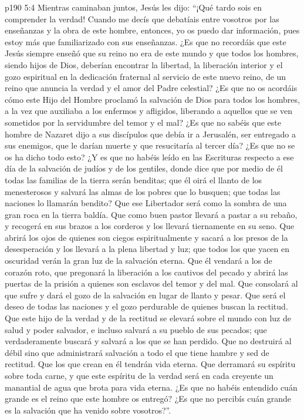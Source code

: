 \vs p190 5:4 Mientras caminaban juntos, Jesús les dijo: “¡Qué tardo sois en comprender la verdad! Cuando me decís que debatíais entre vosotros por las enseñanzas y la obra de este hombre, entonces, yo os puedo dar información, pues estoy más que familiarizado con sus enseñanzas. ¿Es que no recordáis que este Jesús siempre enseñó que su reino no era de este mundo y que todos los hombres, siendo hijos de Dios, deberían encontrar la libertad, la liberación interior y el gozo espiritual en la dedicación fraternal al servicio de este nuevo reino, de un reino que anuncia la verdad y el amor del Padre celestial? ¿Es que no os acordáis cómo este Hijo del Hombre proclamó la salvación de Dios para todos los hombres, a la vez que auxiliaba a los enfermos y afligidos, liberando a aquellos que se ven sometidos por la servidumbre del temor y el mal? ¿Es que no sabéis que este hombre de Nazaret dijo a sus discípulos que debía ir a Jerusalén, ser entregado a sus enemigos, que le darían muerte y que resucitaría al tercer día? ¿Es que no se os ha dicho todo esto? ¿Y es que no habéis leído en las Escrituras respecto a ese día de la salvación de judíos y de los gentiles, donde dice que por medio de él todas las familias de la tierra serán benditas; que él oirá el llanto de los menesterosos y salvará las almas de los pobres que lo busquen; que todas las naciones lo llamarán bendito? Que ese Libertador será como la sombra de una gran roca en la tierra baldía. Que como buen pastor llevará a pastar a su rebaño, y recogerá en sus brazos a los corderos y los llevará tiernamente en su seno. Que abrirá los ojos de quienes son ciegos espiritualmente y sacará a los presos de la desesperación y los llevará a la plena libertad y luz; que todos los que yacen en oscuridad verán la gran luz de la salvación eterna. Que él vendará a los de corazón roto, que pregonará la liberación a los cautivos del pecado y abrirá las puertas de la prisión a quienes son esclavos del temor y del mal. Que consolará al que sufre y dará el gozo de la salvación en lugar de llanto y pesar. Que será el deseo de todas las naciones y el gozo perdurable de quienes buscan la rectitud. Que este hijo de la verdad y de la rectitud se elevará sobre el mundo con luz de salud y poder salvador, e incluso salvará a su pueblo de sus pecados; que verdaderamente buscará y salvará a los que se han perdido. Que no destruirá al débil sino que administrará salvación a todo el que tiene hambre y sed de rectitud. Que los que crean en él tendrán vida eterna. Que derramará su espíritu sobre toda carne, y que este espíritu de la verdad será en cada creyente un manantial de agua que brota para vida eterna. ¿Es que no habéis entendido cuán grande es el reino que este hombre os entregó? ¿Es que no percibís cuán grande es la salvación que ha venido sobre vosotros?”.
